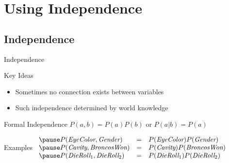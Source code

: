 \documentclass[12pt]{beamer}
\newcommand{\EM}[1]{\mbox{\em#1}}
\newcommand{\tab}{\hspace{1em}}
\begin{document}
\section{Using Independence}
\subsection{Independence}
\begin{frame}{Independence}
	\begin{block}{Key Ideas}
		\begin{itemize}
			\item Sometimes no connection exists between variables
			\pause
			\item Such independence determined by world knowledge
		\end{itemize}
	\end{block}
	\pause
	\begin{block}{Formal Independence}
		$P(a, b) = P(a)P(b)$ \tab or \tab $P(a|b) = P(a)$
	\end{block}
	\pause
	\begin{block}{Examples}
		$
		\begin{array}{lll}
			\pause
			P(\EM{EyeColor},\EM{Gender}) & = & P(\EM{EyeColor})P(\EM{Gender}) \\
			\pause
			P(\EM{Cavity},\EM{BroncosWon}) & = & P(\EM{Cavity})P(\EM{BroncosWon}) \\
			\pause
			P(\EM{DieRoll}_{1},\EM{DieRoll}_{2}) & = & P(\EM{DieRoll}_{1})P(\EM{DieRoll}_{2}) \\
		\end{array}
		$
	\end{block}
\end{frame}
\end{document}

